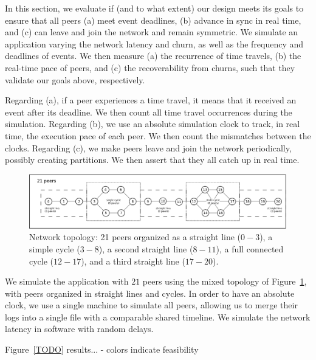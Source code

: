 \documentclass[10pt,journal,compsoc]{IEEEtran}
\begin{document}
In this section, we evaluate if (and to what extent) our design meets its goals
to ensure that all peers (a) meet event deadlines, (b) advance in sync in real
time, and (c) can leave and join the network and remain symmetric.
%
We simulate an application varying the network latency and churn, as well as
the frequency and deadlines of events.
%
We then measure (a) the recurrence of time travels, (b) the real-time pace of
peers, and (c) the recoverability from churns, such that they validate our
goals above, respectively.

Regarding (a), if a peer experiences a time travel, it means that it received
an event after its deadline.
We then count all time travel occurrences during the simulation.
%
Regarding (b), we use an absolute simulation clock to track, in real time, the
execution pace of each peer.
We then count the mismatches between the clocks.
%
Regarding (c), we make peers leave and join the network periodically, possibly
creating partitions.
We then assert that they all catch up in real time.

\begin{figure}[t]
  \centering
  \includegraphics[width=\linewidth]{topo}
  \caption{
    \label{fig.topo}
    Network topology: 21 peers organized as a straight line ($0-3$), a simple
    cycle ($3-8$), a second straight line ($8-11$), a full connected cycle
    ($12-17$), and a third straight line ($17-20$).
  }
\end{figure}

We simulate the application with $21$ peers using the mixed topology of
Figure~\ref{fig.topo}, with peers organized in straight lines and cycles.
%
In order to have an absolute clock, we use a single machine to simulate all
peers, allowing us to merge their logs into a single file with a comparable
shared timeline.
%
We simulate the network latency in software with random delays.

Figure~\ref{TODO} results...
- colors indicate feasibility
\end{document}
